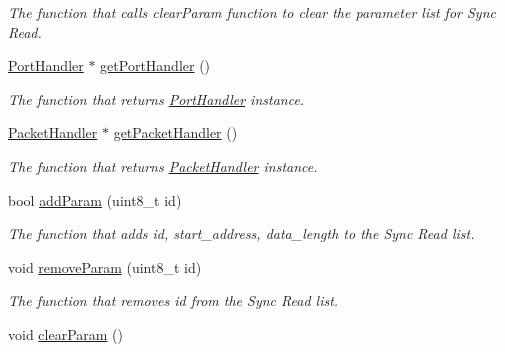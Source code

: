 \begin{DoxyCompactItemize}
\begin{DoxyCompactList}\small\item\em The function that calls clear\+Param function to clear the parameter list for Sync Read. \end{DoxyCompactList}\item 
\hyperlink{classmercury_1_1_port_handler}{Port\+Handler} $\ast$ \hyperlink{classmercury_1_1_group_sync_read_a9bf14be6dbf84a1310e6f21ef7b927a5}{get\+Port\+Handler} ()
\begin{DoxyCompactList}\small\item\em The function that returns \hyperlink{classmercury_1_1_port_handler}{Port\+Handler} instance. \end{DoxyCompactList}\item 
\hyperlink{classmercury_1_1_packet_handler}{Packet\+Handler} $\ast$ \hyperlink{classmercury_1_1_group_sync_read_a3f2de7cb7c8d9b40d9ead61157aa1d7a}{get\+Packet\+Handler} ()
\begin{DoxyCompactList}\small\item\em The function that returns \hyperlink{classmercury_1_1_packet_handler}{Packet\+Handler} instance. \end{DoxyCompactList}\item 
bool \hyperlink{classmercury_1_1_group_sync_read_ae71f56583201a641f461cf6c05935b35}{add\+Param} (uint8\+\_\+t id)
\begin{DoxyCompactList}\small\item\em The function that adds id, start\+\_\+address, data\+\_\+length to the Sync Read list. \end{DoxyCompactList}\item 
void \hyperlink{classmercury_1_1_group_sync_read_af151114e31ba5a6459d34ac6c8e60f7b}{remove\+Param} (uint8\+\_\+t id)
\begin{DoxyCompactList}\small\item\em The function that removes id from the Sync Read list. \end{DoxyCompactList}\item 
void \hyperlink{classmercury_1_1_group_sync_read_ad759a37988a62efb3e4643c424b538e3}{clear\+Param} ()\hypertarget{classmercury_1_1_group_sync_read_ad759a37988a62efb3e4643c424b538e3}{}\label{classmercury_1_1_group_sync_read_ad759a37988a62efb3e4643c424b538e3}


\end{DoxyCompactItemize}
